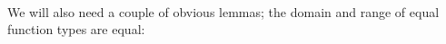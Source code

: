\begin{fence}
\begin{code}
\<%
\\
\>[0]%
\>[5]\AgdaSymbol{|}\AgdaSpace{}%
\AgdaSpace{}%
%
\>[16]\AgdaSymbol{|}\AgdaSpace{}%
\AgdaSymbol{\AgdaUnderscore{}}%
\>[28]\AgdaSymbol{=}%
\>[31]\AgdaSpace{}%
\AgdaSpace{}%
\AgdaSpace{}%
\AgdaSpace{}%
\AgdaSymbol{\}}\<%
\\
\>[0]%
\>[5]\AgdaSymbol{|}\AgdaSpace{}%
\AgdaSpace{}%
\AgdaSymbol{\AgdaUnderscore{}}%
\>[16]\AgdaSymbol{|}\AgdaSpace{}%
\AgdaSpace{}%
%
\>[28]\AgdaSymbol{=}%
\>[31]\AgdaSpace{}%
\AgdaSpace{}%
\AgdaSpace{}%
\AgdaSpace{}%
\AgdaSymbol{\}}\<%
\\
\>[0]%
\>[5]\AgdaSymbol{|}\AgdaSpace{}%
\AgdaSpace{}%
\AgdaSpace{}%
\AgdaSymbol{|}\AgdaSpace{}%
\AgdaSpace{}%
%
\>[28]\AgdaSymbol{=}%
\>[31]\AgdaSpace{}%
\<%
\end{code}
\end{fence}

We will also need a couple of obvious lemmas; the domain and range of
equal function types are equal:

